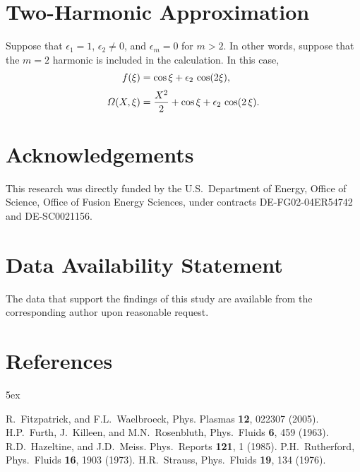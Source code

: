 \documentclass[12pt,prb,aps]{revtex4-1}
\begin{document}
\section{Two-Harmonic Approximation}
Suppose that $\epsilon_1=1$, $\epsilon_2\neq 0$,  and $\epsilon_m=0$ for $m>2$. In other words, suppose that the $m=2$ harmonic
is included in the calculation. In this case,
\begin{align}
f(\xi) &= \cos\xi + \epsilon_2\,\cos(2\xi),\label{e71a}\\[0.5ex]
{\mit\Omega}(X,\xi) &= \frac{X^2}{2}+\cos\xi + \epsilon_2\,\cos(2\,\xi).
\end{align}
 
\section*{Acknowledgements}
This research was directly funded by the U.S.\ Department of Energy, Office of Science, Office of Fusion Energy Sciences,  under  contracts DE-FG02-04ER54742 and DE-SC0021156. 

\section*{Data Availability Statement}
The data that support the findings of this study are available from the corresponding author upon reasonable request.

\section*{References}
\begin{thebibliography}{99}\baselineskip 5ex

 R.~Fitzpatrick, and F.L.~Waelbroeck, Phys. Plasmas {\bf 12}, 022307 (2005).
 H.P.~Furth, J.~Killeen, and M.N.~Rosenbluth, Phys.\ Fluids {\bf 6}, 459 (1963).
 R.D.~Hazeltine, and J.D.~Meiss. Phys.\ Reports {\bf 121}, 1 (1985).
 P.H.~Rutherford,  Phys.\ Fluids {\bf 16}, 1903 (1973).
 H.R.~Strauss, Phys.\  Fluids {\bf 19}, 134 (1976). 
\end{thebibliography}
\end{document}
